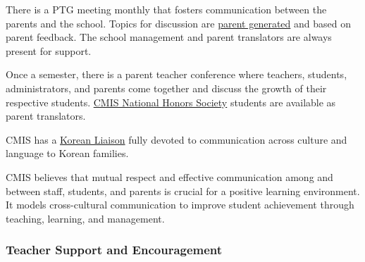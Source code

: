 \begin{findings}

There is a PTG meeting monthly that fosters communication between the parents and the school. Topics for discussion are \href{https://docs.google.com/a/cmis.ac.th/document/d/1kiwakkg8eKdtEexCxVNx-m1CfC3VqxhukDy8WXDPGKY/edit?usp=sharing}{parent generated}  and based on parent feedback. The school management and parent translators are always present for support.

Once a semester, there is a parent teacher conference where teachers, students, administrators, and parents come together and discuss the growth of their respective students. \href{https://docs.google.com/a/cmis.ac.th/document/d/1XA31w9WsFCzB3k9LcQnU46sTUmMeEiObDQ8yOqCPZdU/edit?usp=sharing}{CMIS National Honors Society} students are available as parent translators.

CMIS has a \href{https://docs.google.com/a/cmis.ac.th/document/d/1yZyHuHhAg7tHITOtlZQdX_w4kinRwL6J_Y_zco_7jSE/edit?usp=sharing}{Korean Liaison} fully devoted to communication across culture and language to Korean families.


CMIS believes that mutual respect and effective communication among and between staff, students, and parents is crucial for a positive learning environment. It models cross-cultural communication to improve student achievement through teaching, learning, and management.
\end{findings}

\subsubsection{Teacher Support and Encouragement}



